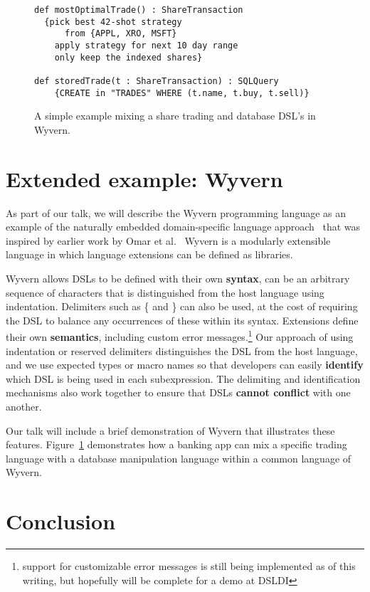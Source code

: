 \documentclass[preprint]{sigplanconf}
\begin{document}
\begin{figure}[t]
\begin{lstlisting}
def mostOptimalTrade() : ShareTransaction
  {pick best 42-shot strategy
      from {APPL, XRO, MSFT}
    apply strategy for next 10 day range
    only keep the indexed shares}

def storedTrade(t : ShareTransaction) : SQLQuery
    {CREATE in "TRADES" WHERE (t.name, t.buy, t.sell)}
\end{lstlisting}
\caption{A simple example mixing a share trading and database DSL's in Wyvern.}
\label{f:dsl}
\end{figure}


\section{Extended example: Wyvern}

As part of our talk, we will describe the Wyvern programming language
as an example of the naturally embedded domain-specific language
approach~\cite{omar:2014:tsls} that was inspired by earlier work by Omar et al.~\cite{ACC_VLHCC}
Wyvern is a modularly extensible language in which language
extensions can be defined as libraries.

Wyvern allows DSLs to be defined with their own \textbf{syntax}, can be
an arbitrary sequence of characters that is distinguished from the host
language using indentation.  Delimiters such as \{ and \} can also be
used, at the cost of requiring the DSL to balance any occurrences of
these within its syntax.  Extensions define their own \textbf{semantics},
including custom error messages.\footnote{support for customizable
error messages is still being implemented as of this writing, but
hopefully will be complete for a demo at DSLDI}  Our approach of
using indentation or reserved delimiters distinguishes the DSL from
the host language, and we use expected types or macro names so that
developers can easily \textbf{identify} which DSL is being used in each
subexpression.  The delimiting and identification mechanisms also work
together to ensure that DSLs \textbf{cannot conflict} with one another.

Our talk will include a brief demonstration of Wyvern that illustrates
these features. Figure~\ref{f:dsl} demonstrates how a banking app can mix a specific trading language with a database manipulation language within a common language of Wyvern.

\section{Conclusion}
\end{document}
